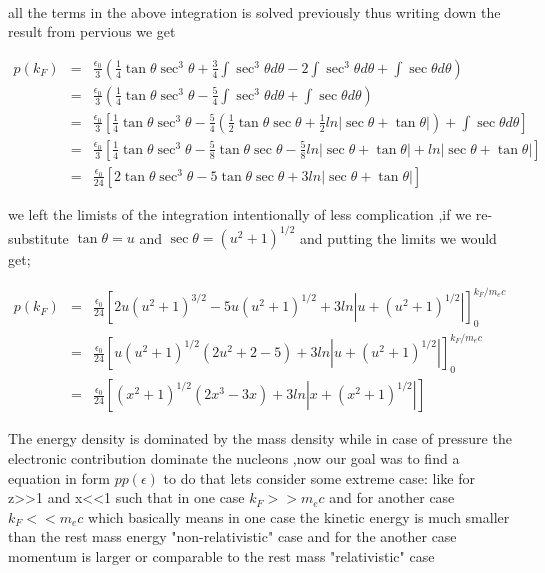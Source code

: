 \documentclass{report}
\begin{document}
\paragraph{ }
all the terms in the above integration is solved previously thus writing down the result from pervious we get 
\begin{center}
\begin{eqnarray}
p(k_F) &=& \frac{\epsilon_0}{3} \left( \frac{1}{4}\tan \theta \sec ^3 \theta + \frac{3}{4}\int \sec^3 \theta d\theta -2\int \sec^3\theta d\theta + \int \sec\theta d\theta \right) \nonumber \\
	&=& \frac{\epsilon_0}{3} \left( \frac{1}{4}\tan \theta \sec ^3 \theta -\frac{5}{4}\int\sec^3\theta d\theta +\int\sec\theta d\theta \right) \nonumber \\
	&=& \frac{\epsilon_0}{3} \left[ \frac{1}{4}\tan \theta \sec ^3 \theta  -\frac{5}{4}( \frac{1}{2}\tan \theta \sec \theta  +\frac{1}{2}ln| \sec \theta + \tan \theta| ) + \int \sec \theta d\theta \right] \nonumber \\
	&=& \frac{\epsilon_0}{3} \left[ \frac{1}{4}\tan \theta \sec ^3 \theta  -\frac{5}{8}\tan \theta \sec \theta - \frac{5}{8}ln| \sec \theta + \tan \theta| + ln| \sec \theta + \tan \theta| \right] \nonumber \\
	&=& \frac{\epsilon_0}{24} \left[ 2\tan \theta \sec ^3 \theta  -5\tan \theta \sec \theta  + 3ln| \sec \theta + \tan \theta| \right] \nonumber
\end{eqnarray}
\end{center}
we left the limists of the integration intentionally of less complication ,if we re-substitute $\tan\theta =u$ and $\sec\theta=(u^2+1)^{1/2}$ and putting the limits we would get;
\begin{center}
\begin{eqnarray}
p(k_F) &=& \frac{\epsilon_0}{24} \left[ 2u( u^2+1)^{3/2} -5 u( u^2+1)^{1/2} +3ln| u+ ( u^2+1)^{1/2}| \right]_0 ^{k_F/m_ec} \nonumber \\
	&=& \frac{\epsilon_0}{24} \left[ u( u^2+1)^{1/2}(2u^2 +2 -5) + 3ln| u+ ( u^2+1)^{1/2}| \right]_0 ^{k_F/m_ec} \nonumber \\
	&=& \frac{\epsilon_0}{24} \left[ ( x^2+1)^{1/2}(2x^3 -3x) + 3ln| x+ ( x^2+1)^{1/2}| \right] 
\label{22}
\end{eqnarray}
\end{center} 
The energy density is dominated by the mass density while in case of  pressure the electronic contribution dominate the nucleons ,now our goal was to find a equation in form $p p(\epsilon)$ to do that lets consider some extreme case: like for z>>1 and x<<1 such that in one case $k_F>>m_ec$ and for another case$k_F<<m_ec$ which basically means in one case the kinetic energy is much smaller than the rest mass energy "non-relativistic" case and for the another case momentum is larger or comparable to the rest mass "relativistic" case
\newpage  
\end{document}
